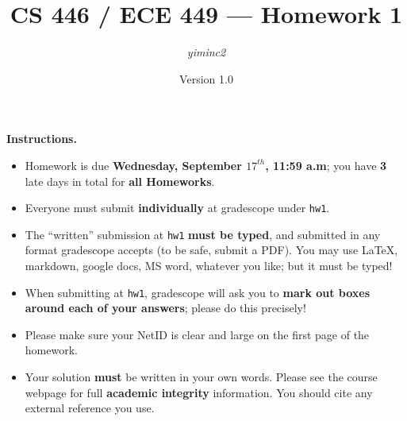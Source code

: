 \documentclass{article}
\title{CS 446 / ECE 449 --- Homework 1}
\author{\emph{yiminc2}}
\date{Version 1.0}
\theoremstyle{definition}
\theoremstyle{remark}
\begin{document}
        \maketitle

        \noindent\textbf{Instructions.}
        \begin{itemize}
          \item
            Homework is due \textbf{Wednesday, September $17^{th}$, 11:59 a.m}; you have \textbf{3} late days in total for \textbf{all Homeworks}.
        
          \item
            Everyone must submit \textbf{individually} at gradescope under \texttt{hw1}. 

        
          \item
            The ``written'' submission at \texttt{hw1} \textbf{must be typed}, and submitted in
            any format gradescope accepts (to be safe, submit a PDF).  You may use \LaTeX, markdown,
            google docs, MS word, whatever you like; but it must be typed!
        
          \item
            When submitting at \texttt{hw1}, gradescope will ask you to \textbf{mark out boxes
            around each of your answers}; please do this precisely!
        
          \item
            Please make sure your NetID is clear and large on the first page of the homework.
        
          \item
            Your solution \textbf{must} be written in your own words.
            Please see the course webpage for full \textbf{academic integrity} information.
            You should cite any external reference you use.
        

           
        \end{itemize}
\end{document}
